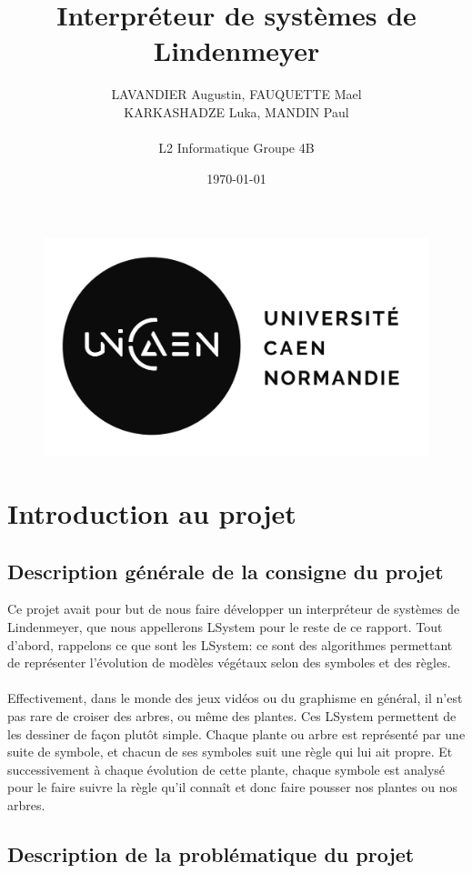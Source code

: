\documentclass[a4paper,12pt]{article}
\title{\textbf{Interpréteur de systèmes de Lindenmeyer}}
\author{LAVANDIER Augustin, FAUQUETTE Mael\\ KARKASHADZE Luka, MANDIN Paul\\ \\ L2 Informatique Groupe 4B}
\date{\today}
\begin{document}
\maketitle
\begin{figure}[h]
\centering
\includegraphics[scale=1]{LOGO-UNICAEN_V-2.1-N.png}
\end{figure}

\newpage
\tableofcontents
\newpage
{}

\section{Introduction au projet}
\subsection{Description générale de la consigne du projet}

Ce projet avait pour but de nous faire développer un interpréteur de systèmes de Lindenmeyer, que nous appellerons LSystem pour le reste de ce rapport.
Tout d'abord, rappelons ce que sont les LSystem: ce sont des algorithmes permettant de représenter l'évolution de modèles végétaux selon des symboles et des règles.
\\\\
Effectivement, dans le monde des jeux vidéos ou du graphisme en général, il n'est pas rare de croiser des arbres, ou même des plantes. Ces LSystem permettent de les dessiner de façon plutôt simple. Chaque plante ou arbre est représenté par une suite de symbole, et chacun de ses symboles suit une règle qui lui ait propre. Et successivement à chaque évolution de cette plante, chaque symbole est analysé pour le faire suivre la règle qu'il connaît et donc faire pousser nos plantes ou nos arbres.

\subsection{Description de la problématique du projet}
\end{document}
